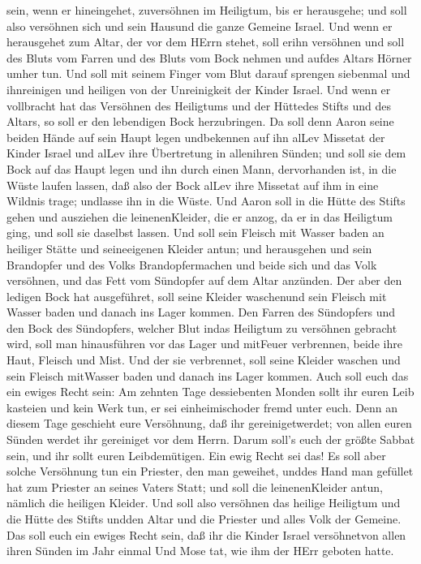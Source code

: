 sein, wenn er hineingehet, zuversöhnen im Heiligtum, bis er herausgehe;
und soll also versöhnen sich und sein Hausund die ganze Gemeine Israel.
 Und wenn er herausgehet zum Altar, der vor dem HErrn
stehet, soll erihn versöhnen und soll des Bluts vom Farren und des Bluts
vom Bock nehmen und aufdes Altars Hörner umher tun.  Und
soll mit seinem Finger vom Blut darauf sprengen siebenmal und
ihnreinigen und heiligen von der Unreinigkeit der Kinder Israel.
 Und wenn er vollbracht hat das Versöhnen des Heiligtums
und der Hüttedes Stifts und des Altars, so soll er den lebendigen Bock
herzubringen.  Da soll denn Aaron seine beiden Hände auf
sein Haupt legen undbekennen auf ihn alLev Missetat der Kinder Israel
und alLev ihre Übertretung in allenihren Sünden; und soll sie dem Bock
auf das Haupt legen und ihn durch einen Mann, dervorhanden ist, in die
Wüste laufen lassen,  daß also der Bock alLev ihre Missetat
auf ihm in eine Wildnis trage; undlasse ihn in die Wüste. 
Und Aaron soll in die Hütte des Stifts gehen und ausziehen die
leinenenKleider, die er anzog, da er in das Heiligtum ging, und soll sie
daselbst lassen.  Und soll sein Fleisch mit Wasser baden an
heiliger Stätte und seineeigenen Kleider antun; und herausgehen und sein
Brandopfer und des Volks Brandopfermachen und beide sich und das Volk
versöhnen,  und das Fett vom Sündopfer auf dem Altar
anzünden.  Der aber den ledigen Bock hat ausgeführet, soll
seine Kleider waschenund sein Fleisch mit Wasser baden und danach ins
Lager kommen.  Den Farren des Sündopfers und den Bock des
Sündopfers, welcher Blut indas Heiligtum zu versöhnen gebracht wird,
soll man hinausführen vor das Lager und mitFeuer verbrennen, beide ihre
Haut, Fleisch und Mist.  Und der sie verbrennet, soll seine
Kleider waschen und sein Fleisch mitWasser baden und danach ins Lager
kommen.  Auch soll euch das ein ewiges Recht sein: Am
zehnten Tage dessiebenten Monden sollt ihr euren Leib kasteien und kein
Werk tun, er sei einheimischoder fremd unter euch.  Denn an
diesem Tage geschieht eure Versöhnung, daß ihr gereinigetwerdet; von
allen euren Sünden werdet ihr gereiniget vor dem Herrn. 
Darum soll's euch der größte Sabbat sein, und ihr sollt euren
Leibdemütigen. Ein ewig Recht sei das!  Es soll aber solche
Versöhnung tun ein Priester, den man geweihet, unddes Hand man gefüllet
hat zum Priester an seines Vaters Statt; und soll die leinenenKleider
antun, nämlich die heiligen Kleider.  Und soll also
versöhnen das heilige Heiligtum und die Hütte des Stifts undden Altar
und die Priester und alles Volk der Gemeine.  Das soll euch
ein ewiges Recht sein, daß ihr die Kinder Israel versöhnetvon allen
ihren Sünden im Jahr einmal Und Mose tat, wie ihm der HErr geboten
hatte.

